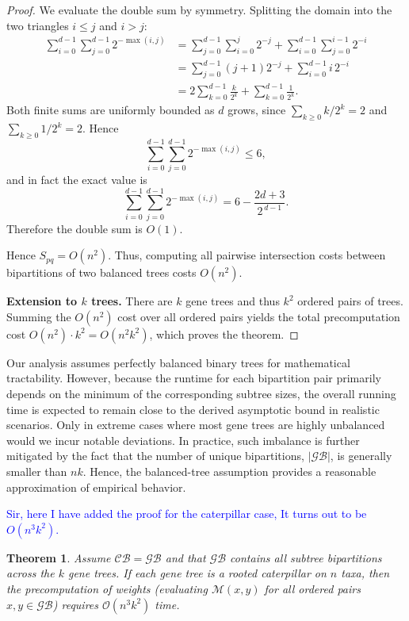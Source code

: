 \documentclass[10pt,a4paper]{article}
\newtheorem{theorem}{Theorem}[section]
\begin{document}
\begin{proof}
We evaluate the double sum by symmetry. Splitting the domain into the two
triangles \(i\le j\) and \(i>j\):
\begin{align*}
\sum_{i=0}^{d-1}\sum_{j=0}^{d-1}2^{-\max(i,j)}
&=\sum_{j=0}^{d-1}\sum_{i=0}^{j}2^{-j}
  +\sum_{i=0}^{d-1}\sum_{j=0}^{i-1}2^{-i} \\[4pt]
&=\sum_{j=0}^{d-1}(j+1)2^{-j}
  +\sum_{i=0}^{d-1}i\,2^{-i} \\[4pt]
&=2\sum_{k=0}^{d-1}\frac{k}{2^{k}}
  +\sum_{k=0}^{d-1}\frac{1}{2^{k}}.
\end{align*}
Both finite sums are uniformly bounded as \(d\) grows, since
\(\sum_{k\ge0}k/2^{k}=2\) and \(\sum_{k\ge0}1/2^{k}=2\).
Hence
\[
\sum_{i=0}^{d-1}\sum_{j=0}^{d-1}2^{-\max(i,j)} \le 6,
\]
and in fact the exact value is
\[
\sum_{i=0}^{d-1}\sum_{j=0}^{d-1}2^{-\max(i,j)}
=6-\frac{2d+3}{2^{\,d-1}}.
\]
Therefore the double sum is \(O(1)\).




Hence \(S_{pq}=O(n^{2})\). Thus, computing all pairwise
intersection costs between bipartitions of two balanced trees costs
\(O(n^{2})\).

\textbf{Extension to $k$ trees.}
There are \(k\) gene trees and thus \(k^{2}\) ordered pairs of trees.
Summing the \(O(n^{2})\) cost over all ordered pairs yields the
total precomputation cost
\(O(n^{2})\cdot k^{2}=O(n^{2}k^{2})\), which proves the theorem.
\end{proof}

Our analysis assumes perfectly balanced binary trees for mathematical tractability. However, because the runtime for each bipartition pair primarily depends on the minimum of the corresponding subtree sizes, the overall running time is expected to remain close to the derived asymptotic bound in realistic scenarios. Only in extreme cases where most gene trees are highly unbalanced would we incur notable deviations. In practice, such imbalance is further mitigated by the fact that the number of unique bipartitions, $|\mathcal{GB}|$, is generally smaller than $nk$. Hence, the balanced-tree assumption provides a reasonable approximation of empirical behavior.





\textcolor{blue}{Sir, here I have added the proof for the caterpillar case, It turns out to be $O(n^3k^2)$.}

\begin{theorem}
\label{th:caterpillar-worst}
Assume $\mathcal{CB}=\mathcal{GB}$ and that $\mathcal{GB}$ contains all subtree bipartitions across the $k$ gene trees. If each gene tree is a rooted caterpillar on $n$ taxa, then the precomputation of weights (evaluating $\mathcal{M}(x,y)$ for all ordered pairs $x,y\in\mathcal{GB}$) requires $\mathcal{O}(n^{3}k^{2})$ time.
\end{theorem}
\end{document}
